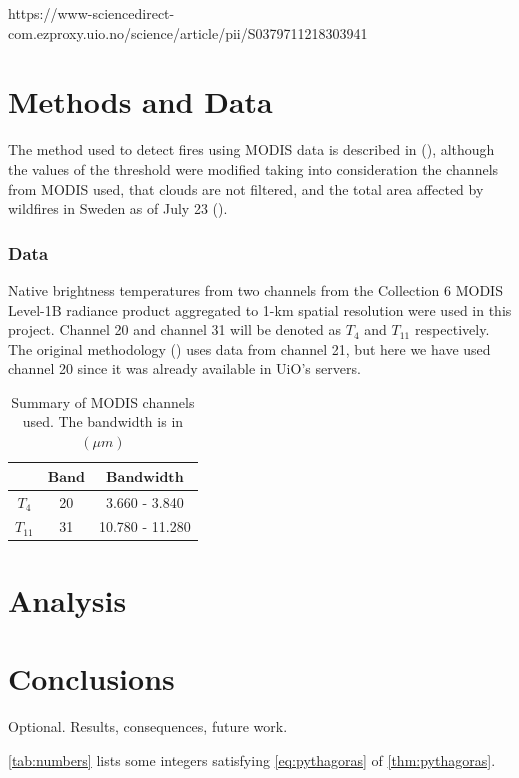 \documentclass[a4paper, article, oneside, UKenglish]{memoir}
\newcommand{\0}{\mathbf{0}}
\newcommand{\1}{\mathbf{1}}
\begin{document}
https://www-sciencedirect-com.ezproxy.uio.no/science/article/pii/S0379711218303941


\chapter{Methods and Data}

The method used to detect fires using MODIS data is described in \citeauthor{giglio_et_al_2016} (\citeyear{giglio_et_al_2016}), although the values of the threshold were modified taking into consideration the channels from MODIS used, that clouds are not filtered, and the total area affected by wildfires in Sweden as of July 23 (\cite{2018_sweden_wildfires}).

\subsection{Data}

Native brightness temperatures from two channels from the Collection 6 MODIS Level-1B radiance product aggregated to 1-km spatial resolution were used in this project. Channel 20 and channel 31 will be denoted as $T_4$ and $T_{11}$ respectively. The original methodology (\cite{giglio_et_al_2016}) uses data from channel 21, but here we have used channel 20 since it was already available in UiO's servers.

\begin{table}[htbp]
    \centering
    \begin{tabular}{@{}ccc@{}}
        \toprule
        \(\boldsymbol{}\) & \(\boldsymbol{Band}\) & \(\boldsymbol{Bandwidth}\)
        \\
        \midrule
        $T_4$     & 20   & 3.660 - 3.840 
        \\
        $T_{11}$    & 31   & 10.780 - 11.280
        \\
        \bottomrule
    \end{tabular}
    \caption{Summary of MODIS channels used. The bandwidth is in $(\mu m)$}
    \label{tab:modis_bands}
\end{table}


\chapter{Analysis}

\chapter{Conclusions}


Optional. Results, consequences, future work.

\cref{tab:numbers} lists some integers satisfying \cref{eq:pythagoras} of \cref{thm:pythagoras}.




\printbibliography
\end{document}
